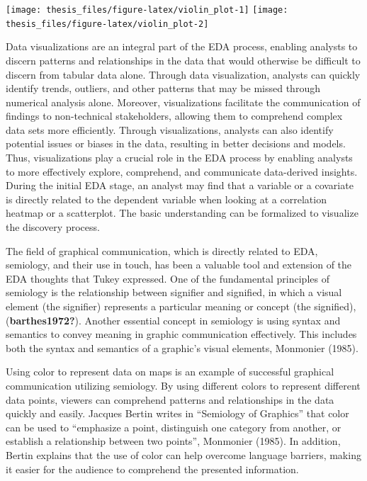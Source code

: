 \documentclass[print]{nuthesis}
\begin{document}
\begin{center}\texttt{[image: thesis\_files/figure-latex/violin\_plot-1]} \texttt{[image: thesis\_files/figure-latex/violin\_plot-2]} \end{center}

Data visualizations are an integral part of the EDA process, enabling analysts to discern patterns and relationships in the data that would otherwise be difficult to discern from tabular data alone.
Through data visualization, analysts can quickly identify trends, outliers, and other patterns that may be missed through numerical analysis alone.
Moreover, visualizations facilitate the communication of findings to non-technical stakeholders, allowing them to comprehend complex data sets more efficiently.
Through visualizations, analysts can also identify potential issues or biases in the data, resulting in better decisions and models.
Thus, visualizations play a crucial role in the EDA process by enabling analysts to more effectively explore, comprehend, and communicate data-derived insights.
During the initial EDA stage, an analyst may find that a variable or a covariate is directly related to the dependent variable when looking at a correlation heatmap or a scatterplot.
The basic understanding can be formalized to visualize the discovery process.

The field of graphical communication, which is directly related to EDA, semiology, and their use in touch, has been a valuable tool and extension of the EDA thoughts that Tukey expressed.
One of the fundamental principles of semiology is the relationship between signifier and signified, in which a visual element (the signifier) represents a particular meaning or concept (the signified), (\textbf{barthes1972?}).
Another essential concept in semiology is using syntax and semantics to convey meaning in graphic communication effectively.
This includes both the syntax and semantics of a graphic's visual elements, Monmonier (1985).

Using color to represent data on maps is an example of successful graphical communication utilizing semiology.
By using different colors to represent different data points, viewers can comprehend patterns and relationships in the data quickly and easily.
Jacques Bertin writes in ``Semiology of Graphics'' that color can be used to ``emphasize a point, distinguish one category from another, or establish a relationship between two points'', Monmonier (1985).
In addition, Bertin explains that the use of color can help overcome language barriers, making it easier for the audience to comprehend the presented information.
\end{document}
